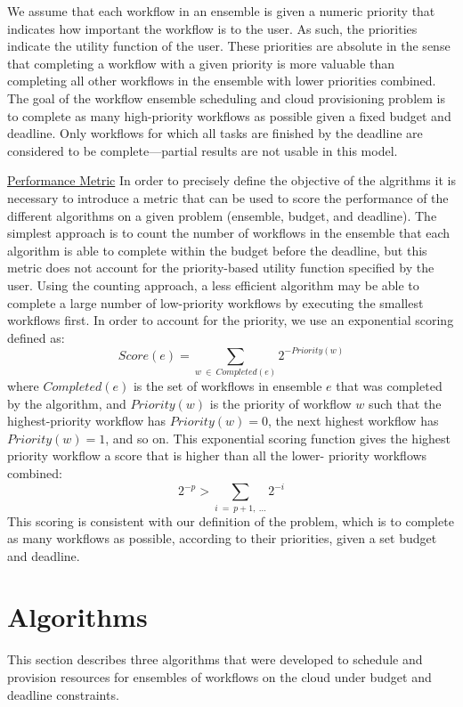 \documentclass[conference]{IEEEtran}
\begin{document}
We assume that each workflow in an ensemble is given a numeric priority that
indicates how important the workflow is to the user. As such, the priorities
indicate the utility function of the user. These priorities are absolute in
the sense that completing a workflow with a given priority is more valuable
than completing all other workflows in the ensemble with lower priorities
combined. The goal of the workflow ensemble scheduling and cloud provisioning
problem is to complete as many high-priority workflows as possible given a
fixed budget and deadline. Only workflows for which all tasks are finished by
the deadline are considered to be complete---partial results are not usable in
this model.

\underline{Performance Metric}
\label{sec:perf_metric}
In order to precisely define the objective of the algrithms it is necessary to
introduce a metric that can be used to score the performance of the different
algorithms on a given problem (ensemble, budget, and deadline). The simplest
approach is to count the number of workflows in the ensemble that each algorithm
is able to complete within the budget before the deadline, but this metric does
not account for the priority-based utility function specified by the user. Using
the counting approach, a less efficient algorithm may be able to complete a
large number of low-priority workflows by executing the smallest workflows
first. In order to account for the priority, we use an exponential
scoring defined as:
$$ Score(e) = \sum_{w~\in~Completed(e)}{2^{-Priority(w)}} $$
where $Completed(e)$ is the set of workflows in ensemble $e$ that was completed
by the algorithm, and $Priority(w)$ is the priority of workflow $w$ such that
the highest-priority workflow has $Priority(w)=0$, the next highest workflow has
$Priority(w)=1$, and so on. This exponential scoring function gives the highest
priority workflow a score that is higher than all the lower- priority workflows
combined:
$$ 2^{-p} > \sum_{i~=~p+1,~\ldots}2^{-i} $$
This scoring is consistent with our definition of the problem, which is to
complete as many workflows as possible, according to their priorities, given a
set budget and deadline.


\section{Algorithms}
\label{sec:algorithms}

This section describes three algorithms that were developed to schedule and
provision resources for ensembles of workflows on the cloud under budget and
deadline constraints.
\end{document}
